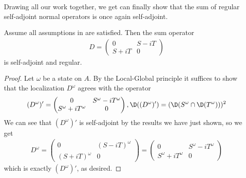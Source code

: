 Drawing all our work together, we get can finally show that the sum of regular self-adjoint normal operators is once again self-adjoint. 
\begin{theorem}\label{locglob71}
	Assume all assumptions in  are satisfied. Then the sum operator 
	\begin{align*}
		D=\begin{pmatrix} 0 & S-iT \\ S+iT & 0\end{pmatrix}
	\end{align*}
is self-adjoint and regular.
\end{theorem} 	
\begin{proof}
	Let $\omega$ be a state on $A$. By the Local-Global principle it suffices to show that the localization $D^\omega$ agrees with the operator 
	\begin{align*}
		(D^\omega)'=\begin{pmatrix} 0 & S^\omega-iT^\omega \\ S^\omega+iT^\omega & 0\end{pmatrix}, \D((D^\omega)')=(\D(S^\omega\cap \D(T^\omega)))^2
	\end{align*}
	We can see that $(D^\omega)'$ is self-adjoint by the results we have just shown, so we get 
	\begin{align*}
		D^\omega=\begin{pmatrix} 0 & (S-iT)^\omega \\ (S+iT)^\omega & 0 \end{pmatrix}=\begin{pmatrix} 0 & S^\omega-iT^\omega \\ S^\omega+iT^\omega & 0\end{pmatrix}
	\end{align*}
	which is exactly $(D^\omega)'$, as desired. 
\end{proof}
